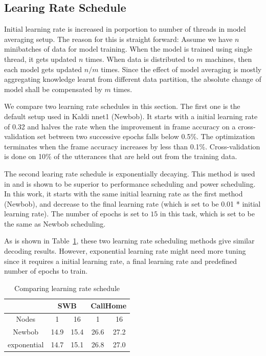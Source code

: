 \documentclass{article}
\begin{document}
\subsection{Learing Rate Schedule}
Initial learning rate is increased in porportion to number of threads in model averaging setup. The reason for this is straight 
forward:
Assume we have $n$ minibatches of data for model training. When the model is trained using single thread, it gets updated $n$
times. When data is distributed to $m$ machines, then each model gets updated $n/m$ times. Since the effect of model averaging 
is mostly aggregating knowledge learnt from different data partition, the absolute change of model shall be compensated by 
$m$ times.

We compare two learning rate schedules in this section. The first one is the default setup used in Kaldi nnet1 (Newbob). 
It starts with a initial learning rate of 0.32 and halves the rate when the improvement in frame accuracy on a cross-validation 
set between two successive epochs falls below 0.5\%. The optimization terminates when the frame accuracy increases by less 
than 0.1\%. Cross-validation is done on 10\% of the utterances that are held out from the training data.

The second learing rate schedule is exponentially decaying. This method is used in \cite{senior2013empirical,povey2014parallel} 
and is shown to be superior to performance scheduling and power scheduling. In this work, it starts with the same initial learning
rate as the first method (Newbob), and decrease to the final learning rate (which is set to be 0.01 * initial learning rate). The
number of epochs is set to $15$ in this task, which is set to be the same as Newbob scheduling.

As is shown in Table~\ref{tab:lr}, these two learning rate scheduling methods give similar decoding results. However, 
exponential learning rate might need more tuning since it requires a initial learning rate, a final learning rate and
predefined number of epochs to train.
\begin{table}
  \centering
  \begin{tabular}{c|c|c|c|c}
    \hline
    & \multicolumn{2}{c|}{SWB}  & \multicolumn{2}{c}{CallHome} \\
    \hline
    Nodes       &  1      & 16    &  1    & 16 \\
    \hline
    Newbob      & 14.9    & 15.4  & 26.6  & 27.2 \\
    \hline
    exponential & 14.7    & 15.1  & 26.8  & 27.0 \\
    \hline
  \end{tabular}
  \caption{Comparing learning rate schedule}
  \label{tab:lr}
\end{table}
\end{document}
